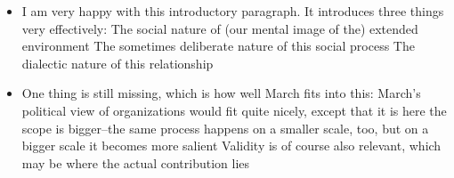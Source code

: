 \begin{itemize}
	\item I am very happy with this introductory paragraph. It introduces three things very effectively:
		\subitem The social nature of (our mental image of the) extended environment
		\subitem The sometimes deliberate nature of this social process
		\subitem The dialectic nature of this relationship
	\item One thing is still missing, which is how well March fits into this:
		\subitem March's political view of organizations would fit quite nicely, except that it is here the scope is bigger--the same process happens on a smaller scale, too, but on a bigger scale it becomes more salient
		\subitem Validity is of course also relevant, which may be where the actual contribution lies
\end{itemize}